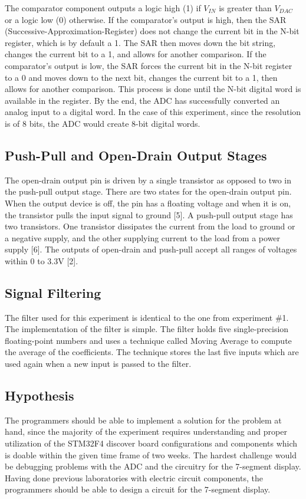 \documentclass[12pt]{report}
\begin{document}
The comparator component outputs a logic high (1) if $V_{IN}$ is greater than $V_{DAC}$ or a logic low (0)
otherwise. If the comparator's output is high, then the SAR (Successive-Approximation-Register) does
not change the current bit in the N-bit register, which is by default a 1. The SAR then moves down
the bit string, changes the current bit to a 1, and allows for another comparison. If the
comparator's output is low, the SAR forces the current bit in the N-bit register to a 0 and moves
down to the next bit, changes the current bit to a 1, then allows for another comparison. This
process is done until the N-bit digital word is available in the register. By the end, the ADC has
successfully converted an analog input to a digital word. In the case of this experiment, since the
resolution is of 8 bits, the ADC would create 8-bit digital words.
\subsection{Push-Pull and Open-Drain Output Stages}
The open-drain output pin is driven by a single transistor as opposed to two in the push-pull output stage. There are two states for the open-drain output pin. When the output device is off, the pin has a floating voltage and when it is on, the transistor pulls the input signal to ground [5].
A push-pull output stage has two transistors. One transistor dissipates the current from the load to ground or a negative supply, and the other supplying current to the load from a power supply [6]. The outputs of open-drain and push-pull accept all ranges of voltages within 0 to 3.3V [2]. 
\subsection{Signal Filtering}
The filter used for this experiment is identical to the one from experiment \#1. The implementation of the filter is simple. The filter holds five single-precision floating-point numbers and uses a technique called Moving Average to compute the average of the coefficients. The technique stores the last five inputs which are used again when a new input is passed to the filter.
\subsection{Hypothesis}
The programmers should be able to implement a solution for the problem at hand, since the majority of the experiment requires understanding and proper utilization of the STM32F4 discover board configurations and components which is doable within the given time frame of two weeks. The hardest challenge would be debugging problems with the ADC and the circuitry for the 7-segment display. Having done previous laboratories with electric circuit components, the programmers should be able to design a circuit for the 7-segment display.
\end{document}
